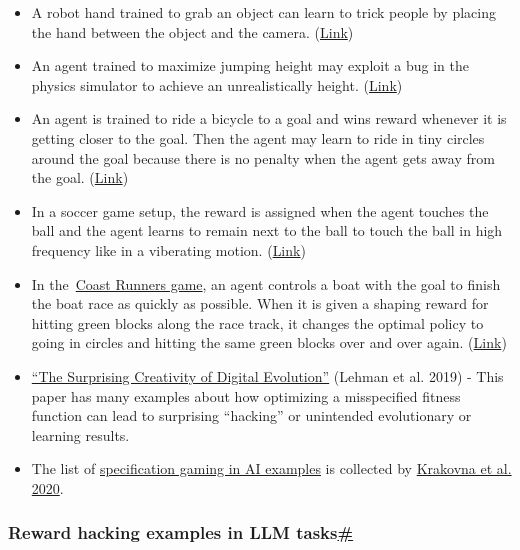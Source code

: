 \begin{itemize}
\tightlist
\item
  A robot hand trained to grab an object can learn to trick people by placing the hand between the object and the camera. (\href{https://openai.com/index/learning-from-human-preferences/}{Link})
\item
  An agent trained to maximize jumping height may exploit a bug in the physics simulator to achieve an unrealistically height. (\href{https://arxiv.org/abs/1803.03453}{Link})
\item
  An agent is trained to ride a bicycle to a goal and wins reward whenever it is getting closer to the goal. Then the agent may learn to ride in tiny circles around the goal because there is no penalty when the agent gets away from the goal. (\href{https://people.eecs.berkeley.edu/~pabbeel/cs287-fa09/readings/NgHaradaRussell-shaping-ICML1999.pdf}{Link})
\item
  In a soccer game setup, the reward is assigned when the agent touches the ball and the agent learns to remain next to the ball to touch the ball in high frequency like in a viberating motion. (\href{https://people.eecs.berkeley.edu/~pabbeel/cs287-fa09/readings/NgHaradaRussell-shaping-ICML1999.pdf}{Link})
\item
  In the~\href{https://openai.com/blog/faulty-reward-functions/}{Coast Runners game}, an agent controls a boat with the goal to finish the boat race as quickly as possible. When it is given a shaping reward for hitting green blocks along the race track, it changes the optimal policy to going in circles and hitting the same green blocks over and over again. (\href{https://deepmind.google/discover/blog/specification-gaming-the-flip-side-of-ai-ingenuity/}{Link})
\item
  \href{https://arxiv.org/abs/1803.03453}{``The Surprising Creativity of Digital Evolution''} (Lehman et al. 2019) - This paper has many examples about how optimizing a misspecified fitness function can lead to surprising ``hacking'' or unintended evolutionary or learning results.
\item
  The list of \href{https://docs.google.com/spreadsheets/d/e/2PACX-1vRPiprOaC3HsCf5Tuum8bRfzYUiKLRqJmbOoC-32JorNdfyTiRRsR7Ea5eWtvsWzuxo8bjOxCG84dAg/pubhtml}{specification gaming in AI examples} is collected by \href{https://deepmind.google/discover/blog/specification-gaming-the-flip-side-of-ai-ingenuity/}{Krakovna et al. 2020}.
\end{itemize}

\subsubsection{\texorpdfstring{Reward hacking examples in LLM tasks\hyperref[reward-hacking-examples-in-llm-tasks]{\#}}{Reward hacking examples in LLM tasks\#}}\label{reward-hacking-examples-in-llm-tasks}

